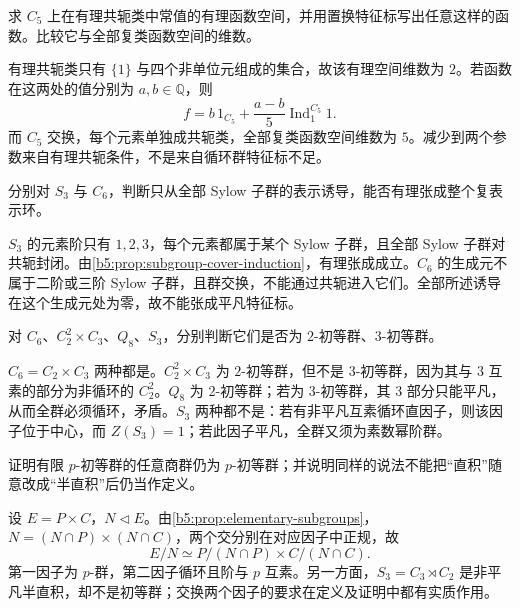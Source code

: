 \begin{exercise}\label{b5:ex:05-rational-classes-c5}
	求 \(C_5\) 上在有理共轭类中常值的有理函数空间，并用置换特征标写出任意这样的函数。比较它与全部复类函数空间的维数。
\end{exercise}
\begin{solution}
	有理共轭类只有 \(\{1\}\) 与四个非单位元组成的集合，故该有理空间维数为 \(2\)。若函数在这两处的值分别为 \(a,b\in\mathbb Q\)，则
	\[
		f=b\,1_{C_5}+\frac{a-b}{5}\operatorname{Ind}_1^{C_5}1.
	\]
	而 \(C_5\) 交换，每个元素单独成共轭类，全部复类函数空间维数为 \(5\)。减少到两个参数来自有理共轭条件，不是来自循环群特征标不足。
\end{solution}

\begin{exercise}\label{b5:ex:05-sylow-cover}
	分别对 \(S_3\) 与 \(C_6\)，判断只从全部 Sylow 子群的表示诱导，能否有理张成整个复表示环。
\end{exercise}
\begin{solution}
	\(S_3\) 的元素阶只有 \(1,2,3\)，每个元素都属于某个 Sylow 子群，且全部 Sylow 子群对共轭封闭。由\cref{b5:prop:subgroup-cover-induction}，有理张成成立。\(C_6\) 的生成元不属于二阶或三阶 Sylow 子群，且群交换，不能通过共轭进入它们。全部所述诱导在这个生成元处为零，故不能张成平凡特征标。
\end{solution}

\begin{exercise}\label{b5:ex:05-elementary-examples}
	对 \(C_6\)、\(C_2^2\times C_3\)、\(Q_8\)、\(S_3\)，分别判断它们是否为 \(2\)-初等群、\(3\)-初等群。
\end{exercise}
\begin{solution}
	\(C_6=C_2\times C_3\) 两种都是。\(C_2^2\times C_3\) 为 \(2\)-初等群，但不是 \(3\)-初等群，因为其与 \(3\) 互素的部分为非循环的 \(C_2^2\)。\(Q_8\) 为 \(2\)-初等群；若为 \(3\)-初等群，其 \(3\) 部分只能平凡，从而全群必须循环，矛盾。\(S_3\) 两种都不是：若有非平凡互素循环直因子，则该因子位于中心，而 \(Z(S_3)=1\)；若此因子平凡，全群又须为素数幂阶群。
\end{solution}

\begin{exercise}\label{b5:ex:05-elementary-quotient}
	证明有限 \(p\)-初等群的任意商群仍为 \(p\)-初等群；并说明同样的说法不能把“直积”随意改成“半直积”后仍当作定义。
\end{exercise}
\begin{solution}
	设 \(E=P\times C\)，\(N\triangleleft E\)。由\cref{b5:prop:elementary-subgroups}，\(N=(N\cap P)\times(N\cap C)\)，两个交分别在对应因子中正规，故
	\[
		E/N\simeq P/(N\cap P)\times C/(N\cap C).
	\]
	第一因子为 \(p\)-群，第二因子循环且阶与 \(p\) 互素。另一方面，\(S_3=C_3\rtimes C_2\) 是非平凡半直积，却不是初等群；交换两个因子的要求在定义及证明中都有实质作用。
\end{solution}


